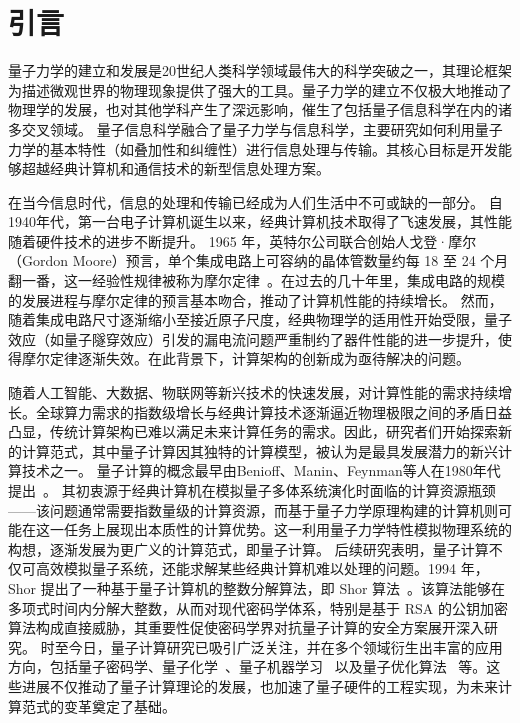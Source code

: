 \chapter{引言}

量子力学的建立和发展是20世纪人类科学领域最伟大的科学突破之一，其理论框架为描述微观世界的物理现象提供了强大的工具。量子力学的建立不仅极大地推动了物理学的发展，也对其他学科产生了深远影响，催生了包括量子信息科学在内的诸多交叉领域。
量子信息科学融合了量子力学与信息科学，主要研究如何利用量子力学的基本特性（如叠加性和纠缠性）进行信息处理与传输。其核心目标是开发能够超越经典计算机和通信技术的新型信息处理方案。

在当今信息时代，信息的处理和传输已经成为人们生活中不可或缺的一部分。
自1940年代，第一台电子计算机诞生以来，经典计算机技术取得了飞速发展，其性能随着硬件技术的进步不断提升。
1965 年，英特尔公司联合创始人戈登·摩尔（Gordon Moore）预言，单个集成电路上可容纳的晶体管数量约每 18 至 24 个月翻一番，这一经验性规律被称为摩尔定律~\cite{moore1965cramming}。在过去的几十年里，集成电路的规模的发展进程与摩尔定律的预言基本吻合，推动了计算机性能的持续增长。
然而，随着集成电路尺寸逐渐缩小至接近原子尺度，经典物理学的适用性开始受限，量子效应（如量子隧穿效应）引发的漏电流问题严重制约了器件性能的进一步提升，使得摩尔定律逐渐失效。在此背景下，计算架构的创新成为亟待解决的问题。


随着人工智能、大数据、物联网等新兴技术的快速发展，对计算性能的需求持续增长。全球算力需求的指数级增长与经典计算技术逐渐逼近物理极限之间的矛盾日益凸显，传统计算架构已难以满足未来计算任务的需求。因此，研究者们开始探索新的计算范式，其中量子计算因其独特的计算模型，被认为是最具发展潜力的新兴计算技术之一。
量子计算的概念最早由Benioff、Manin、Feynman等人在1980年代提出~\cite{Benioff1980,Benioff1982a,Benioff1982b,Manin1980,Feynman1982}。
其初衷源于经典计算机在模拟量子多体系统演化时面临的计算资源瓶颈——该问题通常需要指数量级的计算资源，而基于量子力学原理构建的计算机则可能在这一任务上展现出本质性的计算优势。这一利用量子力学特性模拟物理系统的构想，逐渐发展为更广义的计算范式，即量子计算。
后续研究表明，量子计算不仅可高效模拟量子系统，还能求解某些经典计算机难以处理的问题。1994 年，Shor 提出了一种基于量子计算机的整数分解算法，即 Shor 算法~\cite{shor1994algorithms}。该算法能够在多项式时间内分解大整数，从而对现代密码学体系，特别是基于 RSA 的公钥加密算法构成直接威胁，其重要性促使密码学界对抗量子计算的安全方案展开深入研究。
时至今日，量子计算研究已吸引广泛关注，并在多个领域衍生出丰富的应用方向，包括量子密码学、量子化学~\cite{peruzzo2014variational, kandala2017hardwarea,li2022toward}、量子机器学习~\cite{beer2020training,huang2021experimental,havlivcek2019supervised,mitarai2018quantum} 以及量子优化算法~\cite{farhi2014quantum,moll2018quantum} 等。这些进展不仅推动了量子计算理论的发展，也加速了量子硬件的工程实现，为未来计算范式的变革奠定了基础。


